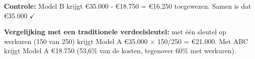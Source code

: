 \documentclass[a4paper,11pt]{article}
\begin{document}
\begin{oefenblok}
\begin{center}
{\begin{minipage}{0.9\textwidth}
                \vspace{0.2cm}

                \textbf{Controle:} Model B krijgt €35.000 - €18.750 = €16.250 toegewezen. Samen is dat €35.000 $\checkmark$

                \vspace{0.2cm}

                \textbf{Vergelijking met een traditionele verdeelsleutel:} met één sleutel op werkuren (150 van 250) krijgt Model A €35.000 $\times$ 150/250 = €21.000. Met ABC krijgt Model A €18.750 (53,6\% van de kosten, tegenover 60\% met werkuren).
            \end{minipage}
        }
    \end{center}

\end{oefenblok}
\end{document}
